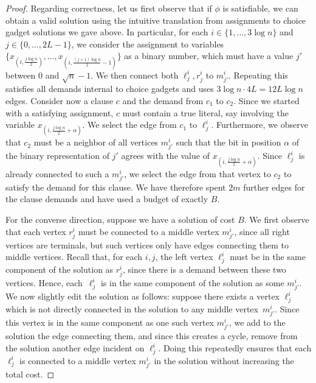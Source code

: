 \documentclass[a4paper]{article}
\theoremstyle{plain}
\begin{document}
\begin{proof}
Regarding correctness, let us first observe that if $\phi$ is satisfiable, we
can obtain a valid solution using the intuitive translation from assignments to
choice gadget solutions we gave above. In particular, for each
$i\in\{1,\ldots,3\log n\}$ and $j\in\{0,\ldots,2L-1\}$, we consider the
assignment to variables $\{x_{(i,\frac{j\log n}{2})},\ldots,
x_{(i,\frac{(j+1)\log n}{2}-1)}\}$ as a binary number, which must have a value
$j'$ between $0$ and $\sqrt{n}-1$. We then connect both $\ell^i_j, r^i_j$ to
$m^i_{j'}$. Repeating this satisfies all demands internal to choice gadgets and
uses $3\log n \cdot 4L = 12 L \log n$ edges. Consider now a clause $c$ and the
demand from $c_1$ to $c_2$. Since we started with a satisfying assignment, $c$
must contain a true literal, say involving the variable $x_{(i,\frac{j\log
n}{2}+\alpha)}$. We select the edge from $c_1$ to $\ell^i_{j}$. Furthermore, we
observe that $c_2$ must be a neighbor of all vertices $m^i_{j'}$ such that the
bit in position $\alpha$ of the binary representation of $j'$ agrees with the
value of $x_{(i,\frac{j\log n}{2}+\alpha)}$. Since $\ell^i_{j}$ is already
connected to such a $m^i_{j'}$, we select the edge from that vertex to $c_2$ to
satisfy the demand for this clause. We have therefore spent $2m$ further edges
for the clause demands and have used a budget of exactly $B$.

For the converse direction, suppose we have a solution of cost $B$. We first
observe that each vertex $r^i_j$ must be connected to a middle vertex
$m^i_{j'}$, since all right vertices are terminals, but such vertices only have
edges connecting them to middle vertices. Recall that, for each $i,j$, the left
vertex $\ell^i_j$ must be in the same component of the solution as $r^i_j$,
since there is a demand between these two vertices. Hence, each~$\ell^i_j$ is
in the same component of the solution as some $m^i_{j'}$. We now slightly edit
the solution as follows: suppose there exists a vertex $\ell^i_j$ which is not
directly connected in the solution to any middle vertex~$m^i_{j'}$. Since this
vertex is in the same component as one such vertex $m^i_{j'}$, we add to the
solution the edge connecting them, and since this creates a cycle, remove from
the solution another edge incident on $\ell^i_j$. Doing this repeatedly ensures
that each $\ell^i_j$ is connected to a middle vertex $m^i_{j'}$ in the solution
without increasing the total cost.


\end{proof}
\end{document}
